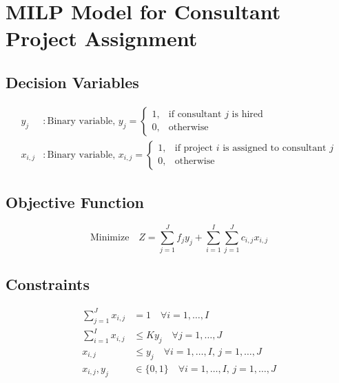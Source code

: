 \documentclass{article}
\begin{document}
\section*{MILP Model for Consultant Project Assignment}

\subsection*{Decision Variables}
\begin{align*}
y_j & : \text{Binary variable, } y_j = 
\begin{cases} 
1, & \text{if consultant } j \text{ is hired} \\ 
0, & \text{otherwise} 
\end{cases} \\
x_{i,j} & : \text{Binary variable, } x_{i,j} = 
\begin{cases} 
1, & \text{if project } i \text{ is assigned to consultant } j \\ 
0, & \text{otherwise} 
\end{cases}
\end{align*}

\subsection*{Objective Function}
\[
\text{Minimize} \quad Z = \sum_{j=1}^{J} f_j y_j + \sum_{i=1}^{I} \sum_{j=1}^{J} c_{i,j} x_{i,j}
\]

\subsection*{Constraints}
\begin{align*}
\sum_{j=1}^{J} x_{i,j} &= 1 \quad \forall i = 1, \ldots, I \\
\sum_{i=1}^{I} x_{i,j} &\leq K y_j \quad \forall j = 1, \ldots, J \\
x_{i,j} &\leq y_j \quad \forall i = 1, \ldots, I, \, j = 1, \ldots, J \\
x_{i,j}, y_j &\in \{0, 1\} \quad \forall i = 1, \ldots, I, \, j = 1, \ldots, J
\end{align*}
\end{document}
